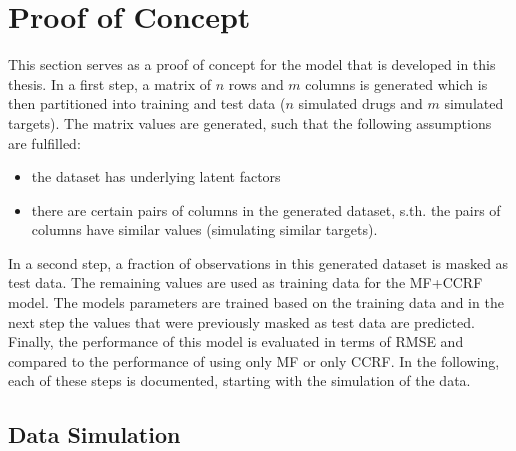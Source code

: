 \section{Proof of Concept}

This section serves as a proof of concept for the model that is developed in this thesis. In a first step, a matrix of $n$ rows and $m$ columns is generated which is then partitioned into training and test data ($n$ simulated drugs and $m$ simulated targets). The matrix values are generated, such that the following assumptions are fulfilled:

\begin{itemize}
\item the dataset has underlying latent factors
\item there are certain pairs of columns in the generated dataset, s.th. the pairs of columns have similar values (simulating similar targets).
\end{itemize}

In a second step, a fraction of observations in this generated dataset is masked as test data. The remaining values are used as training data for the MF+CCRF model. The models parameters are trained based on the training data and in the next step the values that were previously masked as test data are predicted. Finally, the performance of this model is evaluated in terms of RMSE and compared to the performance of using only MF or only CCRF.
In the following, each of these steps is documented, starting with the simulation of the data.

\subsection{Data Simulation}


